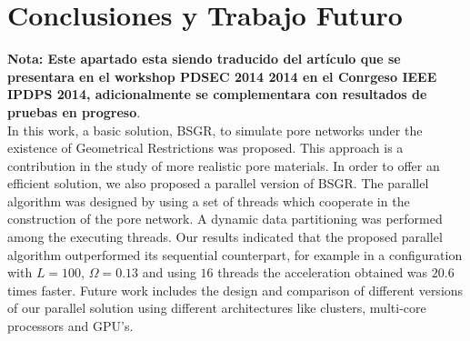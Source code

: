 \chapter{Conclusiones y Trabajo Futuro}
\label{champ:conclusions}
\bigskip
\barra
\bigskip

\textbf{Nota: Este apartado esta siendo traducido del artículo que se presentara en el workshop PDSEC 2014 2014 en el Conrgeso IEEE IPDPS 2014, adicionalmente se complementara con resultados de pruebas en progreso}.\\

In this work, a basic solution, BSGR, to simulate pore networks under the existence of Geometrical Restrictions was proposed. This approach is a contribution in the study of more realistic pore materials. In order to offer an efficient solution, we also proposed a parallel version of BSGR. The parallel algorithm was designed by using a set of threads which cooperate in the construction of the pore network. A dynamic data partitioning was performed among the executing threads. Our results indicated that the proposed parallel algorithm outperformed its sequential counterpart, for example in a configuration with $L= 100$, $\Omega=0.13$ and using $16$ threads the acceleration obtained was $20.6$ times faster. Future work includes the design and comparison of different versions of our parallel solution using different architectures like clusters, multi-core processors and GPU's. 